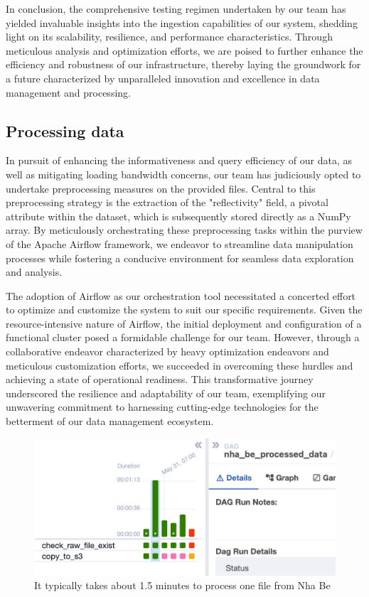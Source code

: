 In conclusion, the comprehensive testing regimen undertaken by our team has
yielded invaluable insights into the ingestion capabilities of our system,
shedding light on its scalability, resilience, and performance characteristics.
Through meticulous analysis and optimization efforts, we are poised to further
enhance the efficiency and robustness of our infrastructure, thereby laying the
groundwork for a future characterized by unparalleled innovation and excellence
in data management and processing.


\subsection{Processing data}

In pursuit of enhancing the informativeness and query efficiency of our data, as
well as mitigating loading bandwidth concerns, our team has judiciously opted to
undertake preprocessing measures on the provided files. Central to this
preprocessing strategy is the extraction of the "reflectivity" field, a pivotal
attribute within the dataset, which is subsequently stored directly as a NumPy
array. By meticulously orchestrating these preprocessing tasks within the
purview of the Apache Airflow framework, we endeavor to streamline data
manipulation processes while fostering a conducive environment for seamless data
exploration and analysis.

The adoption of Airflow as our orchestration tool necessitated a concerted
effort to optimize and customize the system to suit our specific requirements.
Given the resource-intensive nature of Airflow, the initial deployment and
configuration of a functional cluster posed a formidable challenge for our team.
However, through a collaborative endeavor characterized by heavy optimization
endeavors and meticulous customization efforts, we succeeded in overcoming these
hurdles and achieving a state of operational readiness. This transformative
journey underscored the resilience and adaptability of our team, exemplifying
our unwavering commitment to harnessing cutting-edge technologies for the
betterment of our data management ecosystem.

\begin{figure}[ht]
    \centering
    \includegraphics[width=0.8\linewidth]{Images/5-etl-data.png}
    \vspace{1cm}
    \caption{It typically takes about 1.5 minutes to process one file from Nha Be}
    \label{fig:etl-data}
\end{figure}

